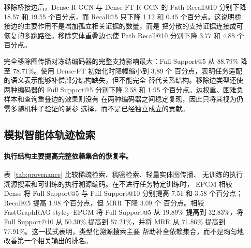 移除桥接边后，Dense R-GCN 与 Dense-FT R-GCN 的 Path Recall@10
分别下降 18.57 和 19.55 个百分点，而 Recall@5 只下降 1.12 和 0.45
个百分点。这说明桥接边的主要作用不是增加孤立相关证据的数量，而是
把分散的支持证据连接成可恢复的多跳路径。移除实体重叠边也使 Path
Recall@10 分别下降 3.77 和 4.88 个百分点。

完全移除图传播对冻结编码器的完整支持影响最大：Full Support@5 从
88.79\% 降至 78.71\%。使用 Dense-FT 初始化时降幅缩小到 3.89 个
百分点，表明任务适配的语义表示能够补偿部分结构缺失，但不能完全
替代关系结构。移除边类型还使两种编码器的 Full Support@5 分别下降
2.58 和 1.95 个百分点。边权重、困难负样本和查询重叠边的效果则没有
在两种编码器之间稳定复现，因此只将其视为仍需多随机种子验证的调参
选择，而不是已经独立成立的贡献。

\subsection{模拟智能体轨迹检索}

\paragraph{执行结构主要提高完整依赖集合的恢复率。}
表~\ref{tab:provenance} 比较稀疏检索、稠密检索、轻量实体图传播、
无训练的执行溯源搜索和可训练的执行溯源编码。在不进行任务特定训练时，
EPGM 相较 Dense 将 Full Support@5 与 Full Support@10 分别提高 7.51
和 3.58 个百分点；Recall@5 提高 1.98 个百分点，但 MRR 下降 3.09 个
百分点。相较 FastGraphRAG-style，EPGM 将 Full Support@5 从 19.89\%
提高到 32.83\%，将 Full Support@10 从 50.30\% 提高到 57.21\%，并将
MRR 从 71.86\% 提高到 77.91\%。这一模式表明，类型化溯源搜索主要
帮助补全依赖集合，而不是均匀地改善第一个相关输出的排名。

\begin{table}[t]
\centering
\small
{}
\caption{合成 2Wiki 执行溯源检索结果。质量指标为百分比，延迟单位为
毫秒/查询。}
\label{tab:provenance}
\end{table}

